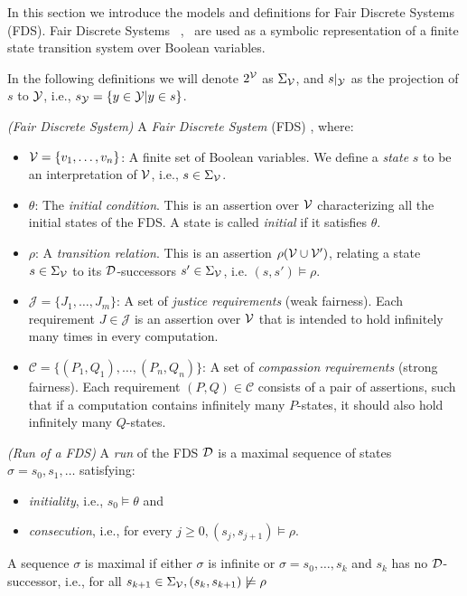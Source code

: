 
In this section we introduce the models and definitions for Fair Discrete Systems (FDS). Fair Discrete Systems ~\cite{kesten2000verification},~\cite{bloem2012synthesis} are used as a symbolic representation of a finite state transition system over Boolean variables. 

In the following definitions we will denote $2^{{\mathcal{V}}}$ as $\Sigma_{{\mathcal{V}}}$, and $s|_{{\mathcal{Y}}}$ as the projection of $s$ to ${\mathcal{Y}}$, i.e., $s_{{\mathcal{Y}}} = \{y \in {\mathcal{Y}} | y \in s \}$.

\begin{definition}
	\label{def:FDS} \emph{(Fair Discrete System)} 
	A \emph{Fair Discrete System} (FDS) \fdsDef, where:
	\begin{itemize}
		\item ${\mathcal{V}} = \{v_1,\ldots,v_n \}$: A finite set of Boolean variables. We define a \emph{state} $s$ to be an interpretation of ${\mathcal{V}}$, i.e., $s \in \Sigma_{{\mathcal{V}}}$.
		\item $\theta$: The \emph{initial condition}. This is an assertion over ${\mathcal{V}}$ characterizing all the initial states of the FDS. A state is called \emph{initial} if it satisfies $\theta$.
		\item $\rho$: A \emph{transition relation}. This is an assertion $\rho({\mathcal{V}} \cup {\mathcal{V}}')$, relating a state $s \in \Sigma_{{\mathcal{V}}}$ to its $\mathcal{D}$-successors $s' \in \Sigma_{{\mathcal{V}}}$, i.e. $(s,s') \models \rho$.
		\item $\mathcal{J} = \{J_1, \ldots, J_m \}$: A set of \emph{justice requirements} (weak fairness). Each requirement $J \in \mathcal{J}$ is an assertion over ${\mathcal{V}}$ that is intended to hold infinitely many times in every computation.
		\item $\mathcal{C} = \{(P_1,Q_1), \ldots, (P_n,Q_n) \}$: A set of \emph{compassion requirements} (strong fairness). Each requirement $(P,Q) \in \mathcal{C}$ consists of a pair of assertions, such that if a computation contains infinitely many $P$-states, it should also hold infinitely many $Q$-states.
	\end{itemize}
\end{definition}

\begin{definition}
	\label{def:fds_run} \emph{(Run of a FDS)} 
	A \emph{run} of the FDS $\mathcal{D}$ is a maximal sequence of states $\sigma = s_0,s_1,\ldots$
	satisfying:
	\begin{itemize}
		\item \emph{initiality}, i.e., $s_0\models \theta$ and
		\item \emph{consecution}, i.e., for every $j\geq 0, (s_j, s_{j+1})\models \rho$.
	\end{itemize}
	A sequence $\sigma$ is maximal if either $\sigma$ is infinite or $\sigma=s_0,\ldots,s_k$ and $s_k$ has no $\mathcal{D}$-successor, i.e., for all $s_{k+1} \in \Sigma_{{\mathcal{V}}}, (s_k,s_{k+1}) \not\models \rho$
\end{definition}


